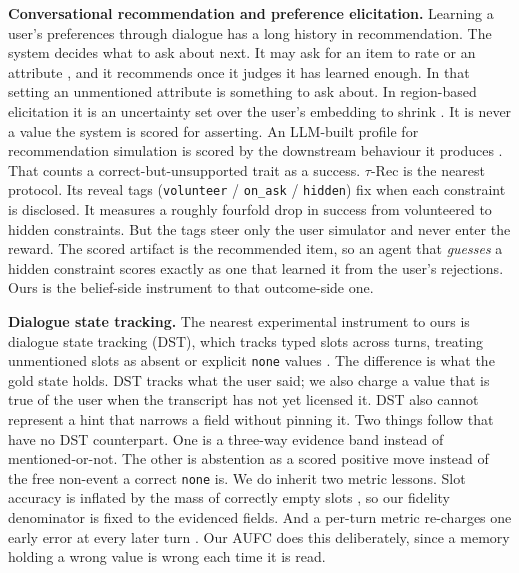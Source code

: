 \documentclass{article}
\begin{document}
\textbf{Conversational recommendation and preference elicitation.} Learning a user's preferences
through dialogue has a long history in recommendation. The system decides what to ask about next. It
may ask for an item to rate \citep{christakopoulou2016towards} or an attribute
\citep{sun2018conversational, lei2020estimation}, and it recommends once it judges it has learned
enough. In that setting an unmentioned attribute is something to ask about. In region-based
elicitation it is an uncertainty set over the user's embedding to shrink \citep{nguyen2024cold}. It
is never a value the system is scored for asserting. An LLM-built profile for recommendation
simulation is scored by the downstream behaviour it produces \citep{wanyan2026task}. That counts a
correct-but-unsupported trait as a success. $\tau$-Rec \citep{narasimhan2026taurec} is the nearest
protocol. Its reveal tags (\texttt{volunteer} / \texttt{on\_ask} / \texttt{hidden}) fix when each
constraint is disclosed. It measures a roughly fourfold drop in success from volunteered to hidden
constraints. But the tags steer only the user
simulator and never enter the reward. The scored artifact is the recommended item, so an agent that
\emph{guesses} a hidden constraint scores exactly as one that learned it from the user's rejections.
Ours is the belief-side instrument to that outcome-side one.

\textbf{Dialogue state tracking.} The nearest experimental instrument to ours is dialogue state
tracking (DST), which tracks typed slots across turns, treating unmentioned slots as absent or
explicit \texttt{none} values \citep{rastogi2020schema, aksu2024granular}. The difference is what
the gold state holds. DST tracks what the user said; we also charge a value that is true of the user
when the transcript has not yet licensed it. DST also cannot represent a hint that narrows a field without
pinning it. Two things follow that have no DST counterpart. One is a three-way evidence band instead of
mentioned-or-not. The other is abstention as a scored positive move instead of the free non-event a
correct \texttt{none} is. We do inherit two metric lessons. Slot accuracy is inflated by the mass of
correctly empty slots \citep{kim2022mismatch}, so our fidelity denominator is fixed to the evidenced
fields. And a per-turn metric re-charges one early error at every later turn
\citep{aksu2024granular}. Our AUFC does this deliberately, since a memory holding a wrong value is
wrong each time it is read.
\end{document}
